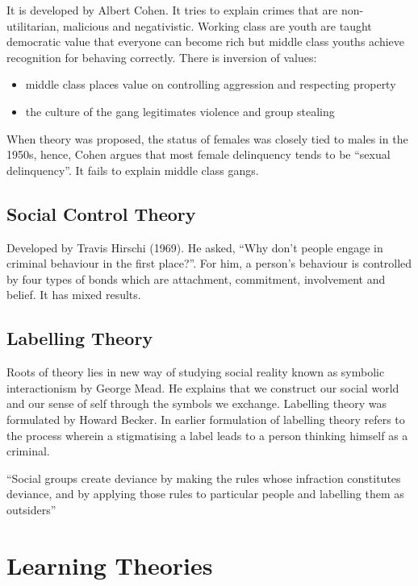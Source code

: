 \documentclass{article}
\begin{document}
It is developed by Albert Cohen. It tries to explain crimes that are non-utilitarian, malicious and negativistic. Working class are youth are taught democratic value that everyone can become rich but middle class youths achieve recognition for behaving correctly. There is inversion of values:

\begin{itemize}
    \item middle class places value on controlling aggression and respecting property
    \item the culture of the gang legitimates violence and group stealing
\end{itemize}

When theory was proposed, the status of females was closely tied to males in the 1950s, hence, Cohen argues that most female delinquency tends to be “sexual delinquency”. It fails to explain middle class gangs.

\subsection{Social Control Theory}

Developed by Travis Hirschi (1969). He asked, “Why don’t people engage in criminal behaviour in the first place?”. For him, a person's behaviour is controlled by four types of bonds which are attachment, commitment, involvement and belief. It has mixed results.

\subsection{Labelling Theory}

Roots of theory lies in new way of studying social reality known as symbolic interactionism by George Mead. He explains that we construct our social world and our sense of self through the symbols we exchange. Labelling theory was formulated by Howard Becker. In earlier formulation of labelling theory refers to the process wherein a stigmatising a label leads to a person thinking himself as a criminal.

“Social groups create deviance by making the rules whose infraction constitutes deviance, and by applying those rules to particular people and labelling them as outsiders”

\section{Learning Theories}
\end{document}
